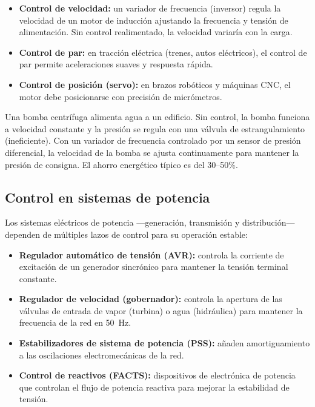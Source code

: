 \begin{itemize}
  \item \textbf{Control de velocidad:} un variador de frecuencia (inversor)
    regula la velocidad de un motor de inducción ajustando la frecuencia
    y tensión de alimentación. Sin control realimentado, la velocidad variaría
    con la carga.
  \item \textbf{Control de par:} en tracción eléctrica (trenes, autos eléctricos),
    el control de par permite aceleraciones suaves y respuesta rápida.
  \item \textbf{Control de posición (servo):} en brazos robóticos y máquinas
    CNC, el motor debe posicionarse con precisión de micrómetros.
\end{itemize}

\begin{aplicacion}
  Una bomba centrífuga alimenta agua a un edificio. Sin control, la bomba
  funciona a velocidad constante y la presión se regula con una válvula de
  estrangulamiento (ineficiente). Con un variador de frecuencia controlado
  por un sensor de presión diferencial, la velocidad de la bomba se ajusta
  continuamente para mantener la presión de consigna. El ahorro energético
  típico es del 30--50\%.
\end{aplicacion}

\subsection{Control en sistemas de potencia}

Los sistemas eléctricos de potencia ---generación, transmisión y distribución---
dependen de múltiples lazos de control para su operación estable:

\begin{itemize}
  \item \textbf{Regulador automático de tensión (AVR):} controla la corriente
    de excitación de un generador sincrónico para mantener la tensión terminal
    constante.
  \item \textbf{Regulador de velocidad (gobernador):} controla la apertura de
    las válvulas de entrada de vapor (turbina) o agua (hidráulica) para mantener
    la frecuencia de la red en \SI{50}{\hertz}.
  \item \textbf{Estabilizadores de sistema de potencia (PSS):} añaden
    amortiguamiento a las oscilaciones electromecánicas de la red.
  \item \textbf{Control de reactivos (FACTS):} dispositivos de electrónica de
    potencia que controlan el flujo de potencia reactiva para mejorar la
    estabilidad de tensión.
\end{itemize}

